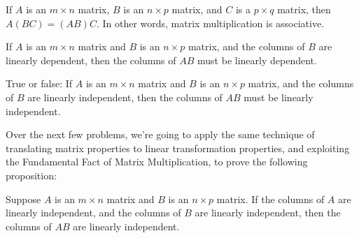 
{}  
If $A$ is an $m\times n$ matrix, $B$ is an $n\times p$ matrix, and $C$ is a $p\times q$ matrix,
then $A(BC) = (AB)C$.  In other words, matrix multiplication is associative.  

\endedxtext


\endedxvertical








{}  
If $A$ is an $m\times n$ matrix and $B$ is an $n\times p$ matrix, and the columns of $B$ are
linearly dependent, then the columns of $AB$ must be linearly dependent. 

\endedxtext





     

True or false: If $A$ is an $m\times n$ matrix and $B$ is an $n\times p$ matrix, and the columns of $B$ are
linearly independent, then the columns of $AB$ must be linearly independent. 





\endedxproblem

\endedxvertical








Over the next few problems, we're going to apply the same 
technique of translating matrix properties to linear transformation properties, and exploiting the
Fundamental Fact of Matrix Multiplication, 
to prove the following proposition:

{}  
Suppose $A$ is an $m\times n$ matrix and $B$ is an $n\times p$ matrix. If the columns of $A$ are
linearly independent, and the columns of $B$ are linearly independent, then the columns of $AB$ are 
linearly independent. 


